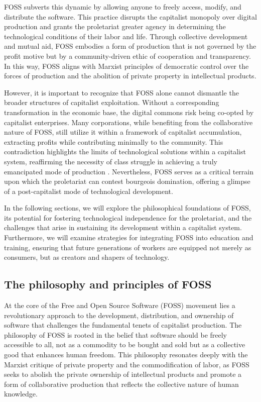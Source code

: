 \begin{refsection}
FOSS subverts this dynamic by allowing anyone to freely access, modify, and distribute the software. This practice disrupts the capitalist monopoly over digital production and grants the proletariat greater agency in determining the technological conditions of their labor and life. Through collective development and mutual aid, FOSS embodies a form of production that is not governed by the profit motive but by a community-driven ethic of cooperation and transparency. In this way, FOSS aligns with Marxist principles of democratic control over the forces of production and the abolition of private property in intellectual products.

However, it is important to recognize that FOSS alone cannot dismantle the broader structures of capitalist exploitation. Without a corresponding transformation in the economic base, the digital commons risk being co-opted by capitalist enterprises. Many corporations, while benefiting from the collaborative nature of FOSS, still utilize it within a framework of capitalist accumulation, extracting profits while contributing minimally to the community. This contradiction highlights the limits of technological solutions within a capitalist system, reaffirming the necessity of class struggle in achieving a truly emancipated mode of production \cite[pp.~245-246]{stallman2010}. Nevertheless, FOSS serves as a critical terrain upon which the proletariat can contest bourgeois domination, offering a glimpse of a post-capitalist mode of technological development.

In the following sections, we will explore the philosophical foundations of FOSS, its potential for fostering technological independence for the proletariat, and the challenges that arise in sustaining its development within a capitalist system. Furthermore, we will examine strategies for integrating FOSS into education and training, ensuring that future generations of workers are equipped not merely as consumers, but as creators and shapers of technology.

\subsection{The philosophy and principles of FOSS}

At the core of the Free and Open Source Software (FOSS) movement lies a revolutionary approach to the development, distribution, and ownership of software that challenges the fundamental tenets of capitalist production. The philosophy of FOSS is rooted in the belief that software should be freely accessible to all, not as a commodity to be bought and sold but as a collective good that enhances human freedom. This philosophy resonates deeply with the Marxist critique of private property and the commodification of labor, as FOSS seeks to abolish the private ownership of intellectual products and promote a form of collaborative production that reflects the collective nature of human knowledge.


\end{refsection}
